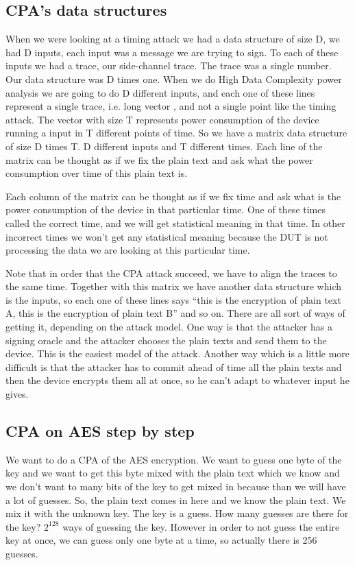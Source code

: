 \subsection{CPA's data structures}\label{c8_CPA_data_structures:subsec}

When we were looking at a timing attack we had a data structure of size D, we had D inputs, each input was a message we are trying to sign. To each of these inputs we had a trace, our side-channel trace. The trace was a single number. Our data structure was D times one.
When we do High Data Complexity power analysis we are going to do D different inputs, and each one of these lines represent a single trace, i.e. long vector , and not a single point like the timing attack. The vector with size T represents power consumption of the device running a input in T different points of time. So we have a matrix data structure of size D times T. D different inputs and T different times.
Each line of the matrix can be thought as if we fix the plain text and ask what the power consumption over time of this plain text is.

Each column of the matrix can be thought as if we fix time and ask what is the power consumption of the device in that particular time.
One of these times called the correct time, and we will get statistical meaning in that time. In other incorrect times we won't get any statistical meaning because the DUT is not processing the data we are looking at this particular time.

Note that in order that the CPA attack succeed, we have to align the traces to the same time.
Together with this matrix we have another data structure which is the inputs, so each one of these lines says “this is the encryption of plain text A, this is the encryption of plain text B” and so on. There are all sort of ways of getting it, depending on the attack model. One way is that the attacker has a signing oracle and the attacker chooses the plain texts and send them to the device. This is the easiest model of the attack. Another way which is a little more difficult is that the attacker has to commit ahead of time all the plain texts and then the device encrypts them all at once, so he can't adapt to whatever input he gives.

\subsection{CPA on AES step by step}\label{c8_CPA_overview:subsec}

We want to do a CPA of the AES encryption. We want to guess one byte of the key and we want to get this byte mixed with the plain text which we know and we don't want to many bits of the key to get mixed in because than we will have a lot of guesses. So, the plain text comes in here and we know the plain text. We mix it with the unknown key. The key is a guess. How many guesses are there for the key?  $2^{128}$ ways of guessing the key. However in order to not guess the entire key at once, we can guess only one byte at a time, so actually there is 256 guesses. 

